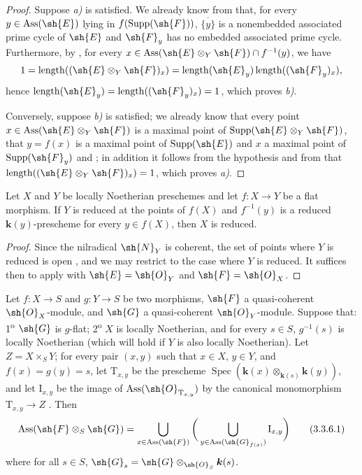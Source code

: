 \begin{proof}
Suppose \emph{a)} is satisfied.
We already know from  that, for every $y\in\operatorname{Ass}(\sh{E})$ lying in $f(\operatorname{Supp}(\sh{F}))$, $\overline{\{y\}}$ is a nonembedded associated prime cycle of $\sh{E}$ and $\sh{F}_y$ has no embedded associated prime cycle.
Furthermore, by , for every $x\in\operatorname{Ass}(\sh{E}\otimes_Y\sh{F})\cap f^{-1}(y)$, we have
\[
1=\operatorname{length}((\sh{E}\otimes_Y\sh{F})_x)
=\operatorname{length}(\sh{E}_y)\operatorname{length}((\sh{F}_y)_x),
\]
hence $\operatorname{length}(\sh{E}_y)=\operatorname{length}((\sh{F}_y)_x)=1$, which proves \emph{b)}.

Conversely, suppose \emph{b)} is satisfied; we already know that every point $x\in\operatorname{Ass}(\sh{E}\otimes_Y\sh{F})$ is a maximal point of $\operatorname{Supp}(\sh{E}\otimes_Y\sh{F})$, that $y=f(x)$ is a maximal point of $\operatorname{Supp}(\sh{E})$ and $x$ a maximal point of $\operatorname{Supp}(\sh{F}_y)$  and ; in addition it follows from the hypothesis and from  that $\operatorname{length}((\sh{E}\otimes_Y\sh{F})_x)=1$, which proves \emph{a)}.
\end{proof}

\begin{corollary}[3.3.5]
\label{IV.3.3.5}
Let $X$ and $Y$ be locally Noetherian preschemes and let $f:X\to Y$ be a flat morphism.
If $Y$ is reduced at the points of $f(X)$ and $f^{-1}(y)$ is a reduced $\boldsymbol{k}(y)$-prescheme for every $y\in f(X)$, then $X$ is reduced.
\end{corollary}

\begin{proof}
Since the nilradical $\sh{N}_Y$ is coherent, the set of points where $Y$ is reduced is open , and we may restrict to the case where $Y$ is reduced.
It suffices then to apply  with $\sh{E}=\sh{O}_Y$ and $\sh{F}=\sh{O}_X$.
\end{proof}

\begin{proposition}[3.3.6]
\label{IV.3.3.6}
Let $f:X\to S$ and $g:Y\to S$ be two morphisms, $\sh{F}$ a quasi-coherent $\sh{O}_X$-module, and $\sh{G}$ a quasi-coherent $\sh{O}_Y$-module.
Suppose that: 1\textsuperscript{o} $\sh{G}$ is $g$-flat; 2\textsuperscript{o} $X$ is locally Noetherian, and for every $s\in S$, $g^{-1}(s)$ is locally Noetherian (which will hold if $Y$ is also locally Noetherian).
Let $Z=X\times_S Y$; for every pair $(x,y)$ such that $x\in X$, $y\in Y$,
and $f(x)=g(y)=s$, let $\mathrm{T}_{x,y}$ be the prescheme $\operatorname{Spec}(\boldsymbol{k}(x)\otimes_{\boldsymbol{k}(s)}\boldsymbol{k}(y))$, and let $\mathrm{I}_{x,y}$ be the image of $\operatorname{Ass}(\sh{O}_{\mathrm{T}_{x,y}})$ by the canonical monomorphism $\mathrm{T}_{x,y}\to Z$ .
Then
\[
\label{IV.3.3.6.1}
\operatorname{Ass}(\sh{F}\otimes_S\sh{G})=\bigcup_{x\in\operatorname{Ass}(\sh{F})}\bigg(\bigcup_{y\in\operatorname{Ass}(\sh{G}_{f(x)})}\mathrm{I}_{x,y}\bigg)
\tag{3.3.6.1}
\]
where for all $s\in S$, $\sh{G}_s=\sh{G}\otimes_{\sh{O}_S}\boldsymbol{k}(s)$.
\end{proposition}

